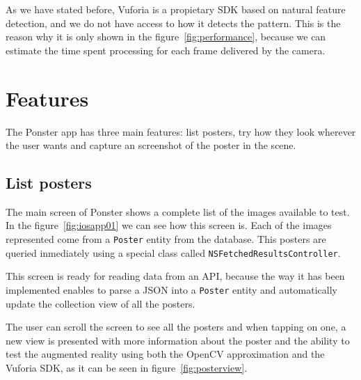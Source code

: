 As we have stated before, Vuforia is a propietary SDK based on natural feature
detection, and we do not have access to how it detects the pattern. This is the
reason why it is only shown in the figure~\ref{fig:performance}, because we can
estimate the time spent processing for each frame delivered by the camera.

\section{Features}
The Ponster app has three main features: list posters, try how they look wherever
the user wants and capture an screenshot of the poster in the scene. 

\subsection*{List posters}
The main screen of Ponster shows a complete list of the images available to
test. In the figure~\ref{fig:iosapp01} we can see how this screen is. Each of
the images represented come from a \texttt{Poster} entity from the
database. This posters are queried inmediately using a special class called
\texttt{NS\-Fetched\-Results\-Controller}. 

This screen is ready for reading data from an API, because the way it has been
implemented enables to parse a JSON into a \texttt{Poster} entity and
automatically update the collection view of all the posters. 

The user can scroll the screen to see all the posters and when tapping on one,
a new view is presented with more information about the poster and the ability
to test the augmented reality using both the OpenCV approximation and the
Vuforia SDK, as it can be seen in figure~\ref{fig:posterview}.

